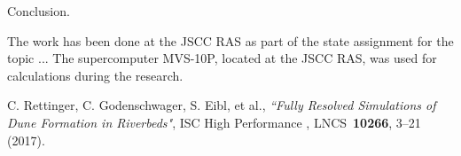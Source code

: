 \documentclass[
11pt,%
tightenlines,%
twoside,%
onecolumn,%
nofloats,%
nobibnotes,%
nofootinbib,%
superscriptaddress,%
noshowpacs,%
centertags]%
{revtex4}
\begin{document}
Conclusion.

\begin{acknowledgments}
The work has been done at the JSCC RAS as part of the state assignment for the topic ... The supercomputer MVS-10P, located at the JSCC RAS, was used for calculations during the research.
\end{acknowledgments}

\begin{thebibliography}{99}

C. Rettinger, C. Godenschwager, S. Eibl, et al., {\it ``Fully Resolved Simulations of Dune Formation in Riverbeds"}, ISC High Performance , LNCS~{\bf 10266}, 3--21 (2017).

\end{thebibliography}
\end{document}
